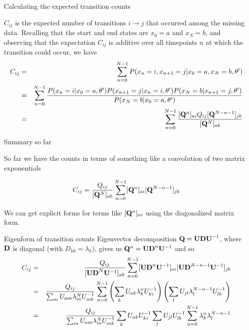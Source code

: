 \documentclass{beamer}
\begin{document}
\begin{frame}{Calculating the expected transition counts}

$C_{ij}$ is the expected number of transitions $i \to j$ that occurred among the missing data.
Recalling that the start and end states are $x_0=a$ and $x_N=b$,
and observing that the expectation $C_{ij}$ is additive over all timepoints $n$ at which the transition could occur,
we have
\small
\begin{eqnarray*}
C_{ij} & = & \sum_{n=0}^{N-1} P(x_n=i,x_{n+1}=j|x_0=a,x_N=b,\theta') \\
& = & \sum_{n=0}^{N-1} \frac{P(x_n=i|x_0=a,\theta') P(x_{n+1}=j|x_n=i,\theta') P(x_N=b|x_{n+1}=j,\theta')}{P(x_N=b|x_0=a,\theta')} \\
& = & \sum_{n=0}^{N-1} \frac{[{\bf Q}^n]_{ai} Q_{ij} [{\bf Q}^{N-n-1}]_{jb}}{[{\bf Q}^N]_{ab}}
\end{eqnarray*}
\end{frame}

\begin{frame}{Summary so far}

So far we have the counts in terms of something like a convolution of two matrix exponentials

\[
C_{ij} = \frac{Q_{ij}}{[{\bf Q}^N]_{ab}} \sum_{n=0}^{N-1} [{\bf Q}^n]_{ai} [{\bf Q}^{N-n-1}]_{jb}
\]

We can get explicit forms for terms like $[{\bf Q}^n]_{ai}$ using the diagonalized matrix form.

\end{frame}

\begin{frame}{Eigenform of transition counts}
Eigenvector decomposition ${\bf Q} = {\bf UDU}^{-1}$, where ${\bf D}$ is diagonal (with $D_{kk} = \lambda_k$),
gives us ${\bf Q}^n = {\bf UD}^n {\bf U}^{-1}$ and so
\begin{eqnarray*}
C_{ij} & = & \frac{Q_{ij}}{[{\bf UD}^N {\bf U}^{-1}]_{ab}}
\sum_{n=0}^{N-1} [{\bf UD}^n {\bf U}^{-1}]_{ai} [{\bf UD}^{N-n-1} {\bf U}^{-1}]_{jb} \\
& = & \frac{Q_{ij}}{\sum_m U_{am} \lambda^N_m U^{-1}_{mb}} \sum_{n=0}^{N-1}
\left( \sum_k U_{ak} \lambda_k^n U^{-1}_{ki} \right)
\left( \sum_l U_{jl} \lambda_l^{N-n-1} U^{-1}_{lb} \right) \\
& = & \frac{Q_{ij}}{\sum_m U_{am} \lambda^N_m U^{-1}_{mb}}
\sum_k U_{ak} U^{-1}_{ki} \sum_l U_{jl} U^{-1}_{lb}
\sum_{n=0}^{N-1} \lambda_k^n \lambda_l^{N-n-1}
\end{eqnarray*}
\end{frame}
\end{document}
